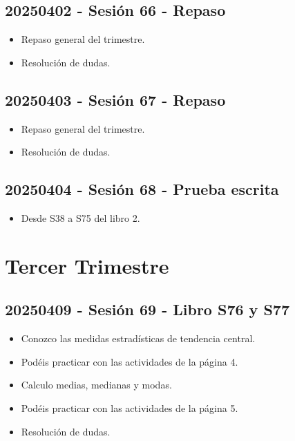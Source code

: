 \documentclass[a4paper,12pt]{article}
\begin{document}
\subsection{20250402 - Sesión 66 - Repaso}

\begin{itemize}
    \item Repaso general del trimestre.
    \item Resolución de dudas.
\end{itemize}

\subsection{20250403 - Sesión 67 - Repaso}

\begin{itemize}
    \item Repaso general del trimestre.
    \item Resolución de dudas.
\end{itemize}

\subsection{20250404 - Sesión 68 - Prueba escrita}

\begin{itemize}
    \item Desde S38 a S75 del libro 2.
\end{itemize}

\section{Tercer Trimestre}

\subsection{20250409 - Sesión 69 - Libro S76 y S77}

\begin{itemize}
    \item Conozco las medidas estradísticas de tendencia central.
    \item Podéis practicar con las actividades de la página 4.
    \item Calculo medias, medianas y modas.
    \item Podéis practicar con las actividades de la página 5.
    \item Resolución de dudas.
\end{itemize}
\end{document}
